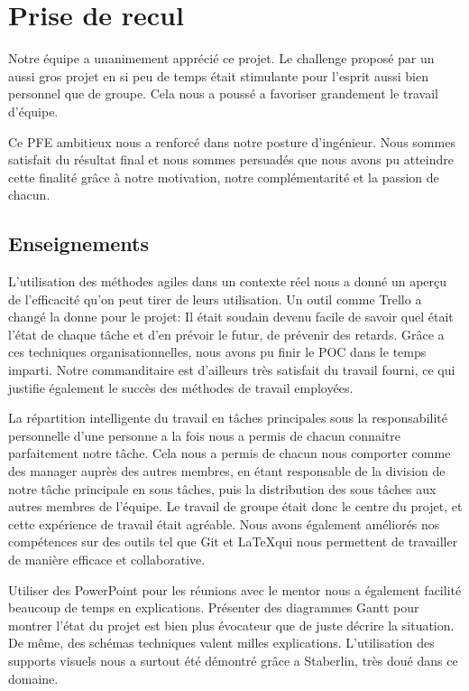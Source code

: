 
\section{Prise de recul}
Notre équipe a unanimement apprécié ce projet.
Le challenge proposé par un aussi gros projet en si peu de temps était stimulante pour l'esprit aussi bien personnel que de groupe.
Cela nous a poussé a favoriser grandement le travail d'équipe.

Ce PFE ambitieux nous a renforcé dans notre posture d’ingénieur. 
Nous sommes satisfait du résultat final et nous sommes persuadés que nous avons pu atteindre cette finalité grâce à notre motivation, notre complémentarité et la passion de chacun. 

\subsection{Enseignements}
L'utilisation des méthodes agiles dans un contexte réel nous a donné un aperçu de l'efficacité qu'on peut tirer de leurs utilisation.
Un outil comme Trello a changé la donne pour le projet: Il était soudain devenu facile de savoir quel était l'état de chaque tâche et d'en prévoir le futur, de prévenir des retards.
Grâce a ces techniques organisationnelles, nous avons pu finir le POC dans le temps imparti.
Notre commanditaire est d'ailleurs très satisfait du travail fourni, ce qui justifie également le succès des méthodes de travail employées.

La répartition intelligente du travail en tâches principales sous la responsabilité personnelle d'une personne a la fois nous a permis de chacun connaitre parfaitement notre tâche.
Cela nous a permis de chacun nous comporter comme des manager auprès des autres membres, en étant responsable de la division de notre tâche principale en sous tâches, puis la distribution des sous tâches aux autres membres de l'équipe.
Le travail de groupe était donc le centre du projet, et cette expérience de travail était agréable.
Nous avons également améliorés nos compétences sur des outils tel que Git et \LaTeX qui nous permettent de travailler de manière efficace et collaborative.

Utiliser des PowerPoint pour les réunions avec le mentor nous a également facilité beaucoup de temps en explications.
Présenter des diagrammes Gantt pour montrer l'état du projet est bien plus évocateur que de juste décrire la situation.
De même, des schémas techniques valent milles explications.
L'utilisation des supports visuels nous a surtout été démontré grâce a Staberlin, très doué dans ce domaine.

